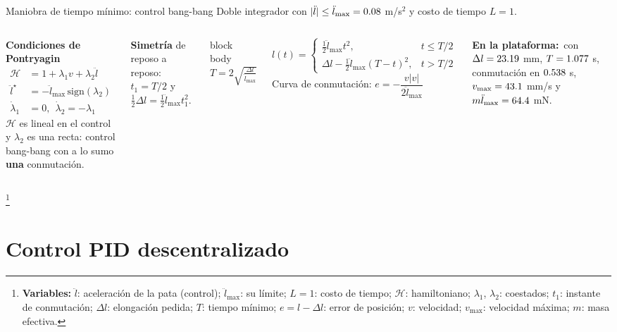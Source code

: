 \documentclass[aspectratio=169,10pt]{beamer}
\newcommand{\variables}[1]{\begingroup\renewcommand{\thefootnote}{}\footnote[frame]{\textbf{Variables:} #1}\addtocounter{footnote}{-1}\endgroup}
\newcommand{\resultado}[1]{\par\smallskip\begin{beamercolorbox}[rounded=true,sep=0.45em,center]{block body}#1\end{beamercolorbox}\par\smallskip}
\newcommand{\valores}{{\color{acento}\textbf{En la plataforma:}}\ }
\begin{document}
\begin{frame}{Maniobra de tiempo mínimo: control bang-bang}
\small
Doble integrador con $|\ddot l| \le \ddot l_{\max} = 0.08$ m/s$^2$ y costo de tiempo $L = 1$.
\begin{columns}[T]
\textbf{Condiciones de Pontryagin}
\begin{align*}
\mathcal H &= 1 + \lambda_1v + \lambda_2\ddot l\\
\ddot l^\star &= -\ddot l_{\max}\,\mathrm{sign}(\lambda_2)\\
\dot\lambda_1 &= 0,\ \ \dot\lambda_2 = -\lambda_1
\end{align*}
$\mathcal H$ es lineal en el control y $\lambda_2$ es una recta: control bang-bang con a lo sumo \textbf{una} conmutación.

\textbf{Simetría} de reposo a reposo: $t_1 = T/2$ y $\tfrac12\Delta l = \tfrac12\ddot l_{\max}t_1^2$.
\resultado{$\displaystyle T = 2\sqrt{\frac{\Delta l}{\ddot l_{\max}}}$}
\[
l(t) = \begin{cases}\tfrac12\ddot l_{\max}t^2, & t\le T/2\\ \Delta l - \tfrac12\ddot l_{\max}(T - t)^2, & t > T/2\end{cases}
\]
Curva de conmutación: $e = -\dfrac{v|v|}{2\ddot l_{\max}}$

\medskip
\valores con $\Delta l = 23.19$ mm, $T = 1.077$ s, conmutación en $0.538$ s, $v_{\max} = 43.1$ mm/s y $m\ddot l_{\max} = 64.4$ mN.
\end{columns}
\variables{$\ddot l$: aceleración de la pata (control); $\ddot l_{\max}$: su límite; $L = 1$: costo de tiempo; $\mathcal H$: hamiltoniano; $\lambda_1$, $\lambda_2$: coestados; $t_1$: instante de conmutación; $\Delta l$: elongación pedida; $T$: tiempo mínimo; $e = l - \Delta l$: error de posición; $v$: velocidad; $v_{\max}$: velocidad máxima; $m$: masa efectiva.}
\end{frame}

\section{Control PID descentralizado}
\end{document}
